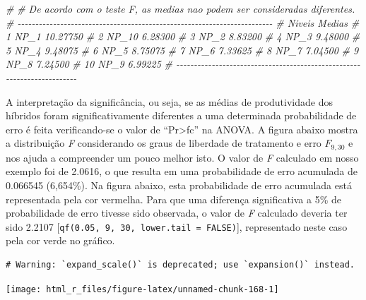 \documentclass[
]{book}
\makeatletter
\newenvironment{Shaded}{\begin{snugshade}}{\end{snugshade}}
\newcommand{\CommentTok}[1]{\textcolor[rgb]{0.56,0.35,0.01}{\textit{#1}}}
\numberwithin{equation}{section}
\newcommand{\indf}[1]{\index[function]{#1@\texttt{#1()}|ST}}
\makeatother
\begin{document}
\begin{Shaded}
\begin{Highlighting}[]
\CommentTok{\# }
\CommentTok{\# De acordo com o teste F, as medias nao podem ser consideradas diferentes.}
\CommentTok{\# {-}{-}{-}{-}{-}{-}{-}{-}{-}{-}{-}{-}{-}{-}{-}{-}{-}{-}{-}{-}{-}{-}{-}{-}{-}{-}{-}{-}{-}{-}{-}{-}{-}{-}{-}{-}{-}{-}{-}{-}{-}{-}{-}{-}{-}{-}{-}{-}{-}{-}{-}{-}{-}{-}{-}{-}{-}{-}{-}{-}{-}{-}{-}{-}{-}{-}{-}{-}{-}{-}{-}{-}}
\CommentTok{\#    Niveis   Medias}
\CommentTok{\# 1    NP\_1 10.27750}
\CommentTok{\# 2   NP\_10  6.28300}
\CommentTok{\# 3    NP\_2  8.83200}
\CommentTok{\# 4    NP\_3  9.48000}
\CommentTok{\# 5    NP\_4  9.48075}
\CommentTok{\# 6    NP\_5  8.75075}
\CommentTok{\# 7    NP\_6  7.33625}
\CommentTok{\# 8    NP\_7  7.04500}
\CommentTok{\# 9    NP\_8  7.24500}
\CommentTok{\# 10   NP\_9  6.99225}
\CommentTok{\# {-}{-}{-}{-}{-}{-}{-}{-}{-}{-}{-}{-}{-}{-}{-}{-}{-}{-}{-}{-}{-}{-}{-}{-}{-}{-}{-}{-}{-}{-}{-}{-}{-}{-}{-}{-}{-}{-}{-}{-}{-}{-}{-}{-}{-}{-}{-}{-}{-}{-}{-}{-}{-}{-}{-}{-}{-}{-}{-}{-}{-}{-}{-}{-}{-}{-}{-}{-}{-}{-}{-}{-}}
\end{Highlighting}
\end{Shaded}

\indf{crd}

A interpretação da significância, ou seja, se as médias de produtividade dos híbridos foram significativamente diferentes a uma determinada probabilidade de erro é feita verificando-se o valor de ``Pr\textgreater fc'' na ANOVA. A figura abaixo mostra a distribuição \emph{F} considerando os graus de liberdade de tratamento e erro \(F_{9, 30}\) e nos ajuda a compreender um pouco melhor isto. O valor de \emph{F} calculado em nosso exemplo foi de 2.0616, o que resulta em uma probabilidade de erro acumulada de 0.066545 (6,654\%). Na figura abaixo, esta probabilidade de erro acumulada está representada pela cor vermelha. Para que uma diferença significativa a 5\% de probabilidade de erro tivesse sido observada, o valor de \emph{F} calculado deveria ter sido 2.2107 {[}\texttt{qf(0.05,\ 9,\ 30,\ lower.tail\ =\ FALSE)}{]}, representado neste caso pela cor verde no gráfico.

\begin{verbatim}
# Warning: `expand_scale()` is deprecated; use `expansion()` instead.
\end{verbatim}

\begin{center}\texttt{[image: html\_r\_files/figure-latex/unnamed-chunk-168-1]} \end{center}
\end{document}
